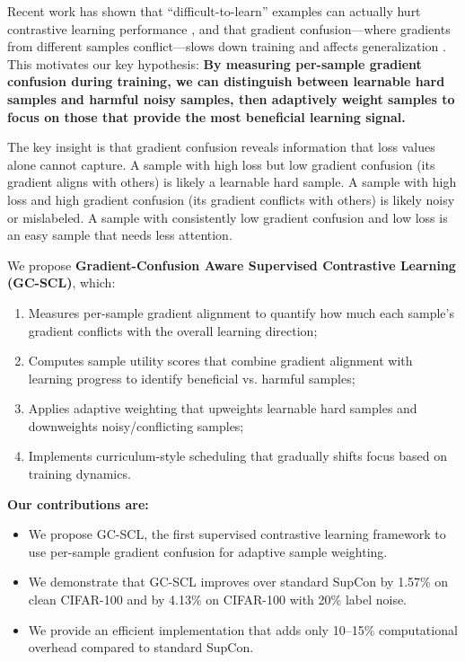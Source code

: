\documentclass{article}
\begin{document}
Recent work has shown that ``difficult-to-learn'' examples can actually hurt contrastive learning performance \citep{zhang2025understanding}, and that gradient confusion---where gradients from different samples conflict---slows down training and affects generalization \citep{sankararaman2020impact}. This motivates our key hypothesis: \textbf{By measuring per-sample gradient confusion during training, we can distinguish between learnable hard samples and harmful noisy samples, then adaptively weight samples to focus on those that provide the most beneficial learning signal.}

The key insight is that gradient confusion reveals information that loss values alone cannot capture. A sample with high loss but low gradient confusion (its gradient aligns with others) is likely a learnable hard sample. A sample with high loss and high gradient confusion (its gradient conflicts with others) is likely noisy or mislabeled. A sample with consistently low gradient confusion and low loss is an easy sample that needs less attention.

We propose \textbf{Gradient-Confusion Aware Supervised Contrastive Learning (GC-SCL)}, which:
\begin{enumerate}
    \item Measures per-sample gradient alignment to quantify how much each sample's gradient conflicts with the overall learning direction;
    \item Computes sample utility scores that combine gradient alignment with learning progress to identify beneficial vs. harmful samples;
    \item Applies adaptive weighting that upweights learnable hard samples and downweights noisy/conflicting samples;
    \item Implements curriculum-style scheduling that gradually shifts focus based on training dynamics.
\end{enumerate}

\textbf{Our contributions are:}
\begin{itemize}
    \item We propose GC-SCL, the first supervised contrastive learning framework to use per-sample gradient confusion for adaptive sample weighting.
    \item We demonstrate that GC-SCL improves over standard SupCon by 1.57\% on clean CIFAR-100 and by 4.13\% on CIFAR-100 with 20\% label noise.
    \item We provide an efficient implementation that adds only 10--15\% computational overhead compared to standard SupCon.
\end{itemize}
\end{document}
